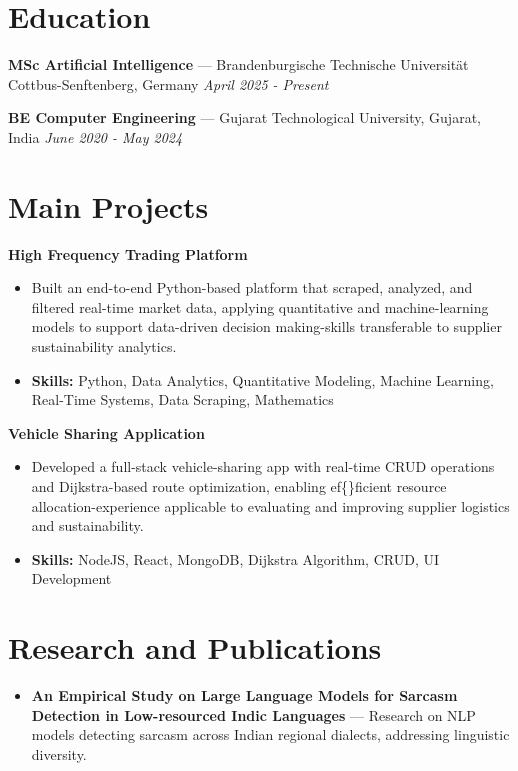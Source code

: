 \documentclass[a4paper,10pt]{article}
\begin{document}
\section*{Education}
\textbf{MSc Artificial Intelligence} — Brandenburgische Technische Universität Cottbus-Senftenberg, Germany \hfill \textit{April 2025 - Present}\par
\vspace{1.5pt}
\textbf{BE Computer Engineering} — Gujarat Technological University, Gujarat, India \hfill \textit{June 2020 - May 2024}\par

\section*{Main Projects}
\textbf{High Frequency Trading Platform}\par
\vspace{1pt}
\begin{itemize}
  \item Built an end-to-end Python-based platform that scraped, analyzed, and filtered real-time market data, applying quantitative and machine-learning models to support data-driven decision making-skills transferable to supplier sustainability analytics.
  \item \textbf{Skills:} Python, Data Analytics, Quantitative Modeling, Machine Learning, Real-Time Systems, Data Scraping, Mathematics
\end{itemize}
\vspace{3pt}
\textbf{Vehicle Sharing Application}\par
\vspace{1pt}
\begin{itemize}
  \item Developed a full-stack vehicle-sharing app with real-time CRUD operations and Dijkstra-based route optimization, enabling ef\{\}ficient resource allocation-experience applicable to evaluating and improving supplier logistics and sustainability.
  \item \textbf{Skills:} NodeJS, React, MongoDB, Dijkstra Algorithm, CRUD, UI Development
\end{itemize}

\section*{Research and Publications}
\begin{itemize}
\item \textbf{An Empirical Study on Large Language Models for Sarcasm Detection in Low-resourced Indic Languages} — Research on NLP models detecting sarcasm across Indian regional dialects, addressing linguistic diversity.
\end{itemize}
\end{document}
